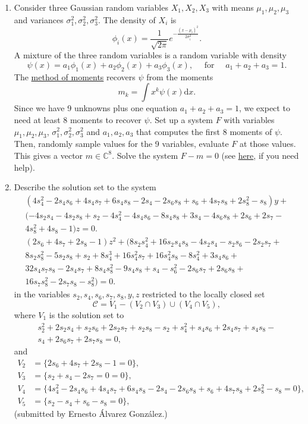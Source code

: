 \documentclass[11pt,reqno]{amsart}
\theoremstyle{definition}
\theoremstyle{remark}
\numberwithin{equation}{section}
\begin{document}
\begin{enumerate}
\item Consider three Gaussian random variables $X_1,X_2,X_3$ with means $\mu_1,\mu_2,\mu_3$ and variances $\sigma_1^2,\sigma_2^2,\sigma_3^2$. The density of $X_i$ is
$$\phi_i(x) = \frac{1}{\sqrt{2\pi}} e^{-\frac{(x-\mu_i)^2}{2\sigma_i^2}}.$$
A mixture of the three random variables is a random variable with density
$$\psi(x) = a_1 \phi_1(x) + a_2 \phi_2(x) + a_3 \phi_3(x), \quad\text{   for } \quad  a_1+a_2+a_3 =1.$$
The \href{https://en.wikipedia.org/wiki/Method_of_moments_(statistics)}{method of moments} recovers $\psi$ from the moments
  $$m_k = \int x^k \psi(x) \mathrm{d}x.$$
Since we have 9 unknowns plus one equation $a_1+a_2+a_3=1$, we expect to need at least 8 moments to recover $\psi$. Set up a system $F$ with variables $\mu_1,\mu_2,\mu_3$, $\sigma_1^2,\sigma_2^2,\sigma_3^2$ and $a_1,a_2,a_3$ that computes the first 8 moments of $\psi$. Then, randomly sample values for the 9 variables, evaluate $F$ at those values. This gives a vector $m\in \mathbb C^8$. Solve the system $F-m=0$ (see \href{https://www.juliahomotopycontinuation.org/examples/method-of-moments/}{here}, if you need help).

\item Describe the solution set to the system
\begin{align*}
(4s_4^2-2s_4s_6+4s_4s_7+6s_4s_8-2s_4-2s_6s_8+s_6+4s_7s_8+2s_8^2-s_8)y+\\
(-4s_2s_4-4s_2s_8+s_2-4s_4^2-4s_4s_6-8s_4s_8+3s_4-4s_6s_8+2s_6+2s_7- \\
4s_8^2+4s_8-1)z = 0.\\
(2s_6+4s_7+2s_8-1)z^2+(8s_2s_4^2+16s_2s_4s_8-4s_2s_4-s_2s_6-2s_2s_7+ \\
8s_2s_8^2-5s_2s_8+s_2+8s_4^3+16s_4^2s_7+16s_4^2s_8-8s_4^2+3s_4s_6+ \\
32s_4s_7s_8-2s_4s_7+8s_4s_8^2-9s_4s_8+s_4-s_6^2-2s_6s_7+2s_6s_8+\\
16s_7s_8^2-2s_7s_8-s_8^2) = 0.
\end{align*}
in the variables $s_2,s_4,s_6,s_7,s_8, y,z$ restricted to the locally closed set
$$\mathcal{C} = {V}_1-({V}_2\cap{V}_3)\cup({V}_4\cap{V}_5),$$
where ${V}_1$ is the solution set to
\begin{align*}
s_2^2+2s_2s_4+s_2s_6+2s_2s_7+s_2s_8-s_2+s_4^2+s_4s_6+2s_4s_7+s_4s_8-\\
s_4+2s_6s_7+2s_7s_8 = 0,
\end{align*}
and
\begin{align*}
{V}_2  &= \{2s_6+4s_7+2s_8-1 = 0\},\\
{V}_3  &= \{s_2+s_4-2s_7 = 0 = 0\},\\
{V}_4  &= \{4s_4^2-2s_4s_6+4s_4s_7+6s_4s_8-2s_4-2s_6s_8+s_6+4s_7s_8+2s_8^2-s_8  = 0\},\\
{V}_5  &= \{s_2-s_4+s_6-s_8 = 0\},
\end{align*}
(submitted by Ernesto \'{A}lvarez Gonz\'{a}lez.)


\end{enumerate}
\end{document}
